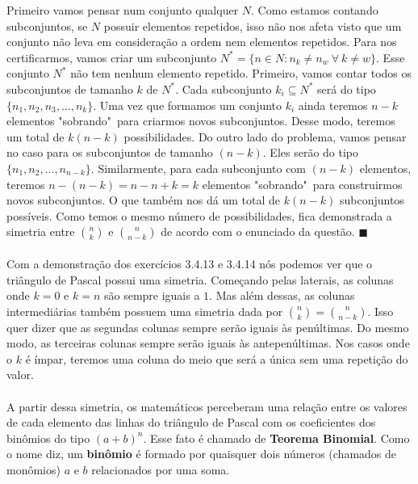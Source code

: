 \documentclass[main.tex]{subfiles}
\begin{document}
Primeiro vamos pensar num conjunto qualquer $N$. Como estamos contando subconjuntos, se $N$ possuir elementos repetidos, isso não nos afeta visto que um conjunto não leva em consideração a ordem nem elementos repetidos. Para nos certificarmos, vamos criar um subconjunto $N^* = \{n \in N : n_k \neq n_w \ \forall \  k \neq w \}$. Esse conjunto $N^*$ não tem nenhum elemento repetido. Primeiro, vamos contar todos os subconjuntos de tamanho $k$ de $N^*$. Cada subconjunto $k_i \subseteq N^*$ será do tipo $\{n_1,n_2,n_3,...,n_k\}$. Uma vez que formamos um conjunto $k_i$ ainda teremos $n - k$ elementos "sobrando"\ para criarmos novos subconjuntos. Desse modo, teremos um total de $k(n-k)$ possibilidades. Do outro lado do problema, vamos pensar no caso para os subconjuntos de tamanho $(n-k)$. Eles serão do tipo $\{n_1,n_2,...,n_{n-k}\}$. Similarmente, para cada subconjunto com $(n-k)$ elementos, teremos $n-(n-k)=n-n+k=k$ elementos "sobrando"\ para construirmos novos subconjuntos. O que também nos dá um total de $k(n-k)$ subconjuntos possíveis. Como temos o mesmo número de possibilidades, fica demonstrada a simetria entre ${n \choose k}$ e ${n \choose n-k}$ de acordo com o enunciado da questão. $\blacksquare$
\\~\\
Com a demonstração dos exercícios 3.4.13 e 3.4.14 nós podemos ver que o triângulo de Pascal possui uma simetria. Começando pelas laterais, as colunas onde $k = 0$ e $k = n$ são sempre iguais a $1$. Mas além dessas, as colunas intermediárias também possuem uma simetria dada por ${n \choose k} = {n \choose n-k}$. Isso quer dizer que as segundas colunas sempre serão iguais às penúltimas. Do mesmo modo, as terceiras colunas sempre serão iguais às antepenúltimas. Nos casos onde o $k$ é ímpar, teremos uma coluna do meio que será a única sem uma repetição do valor.
\\~\\
A partir dessa simetria, os matemáticos perceberam uma relação entre os valores de cada elemento das linhas do triângulo de Pascal com os coeficientes dos binômios do tipo $(a+b)^n$. Esse fato é chamado de \textbf{Teorema Binomial}. Como o nome diz, um \textbf{binômio} é formado por quaisquer dois números (chamados de monômios) $a$ e $b$ relacionados por uma soma.

\pagebreak
\end{document}
